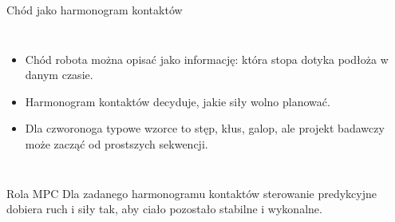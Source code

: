 \begin{frame}{Chód jako harmonogram kontaktów}
\begin{columns}[T,onlytextwidth]
\begin{itemize}
  \item Chód robota można opisać jako informację: która stopa dotyka podłoża w danym czasie.
  \item Harmonogram kontaktów decyduje, jakie siły wolno planować.
  \item Dla czworonoga typowe wzorce to stęp, kłus, galop, ale projekt badawczy może zacząć od prostszych sekwencji.
\end{itemize}
\begin{center}
\end{center}
\end{columns}
\begin{block}{Rola MPC}
Dla zadanego harmonogramu kontaktów sterowanie predykcyjne dobiera ruch i siły tak, aby ciało pozostało stabilne i wykonalne.
\end{block}
\end{frame}

